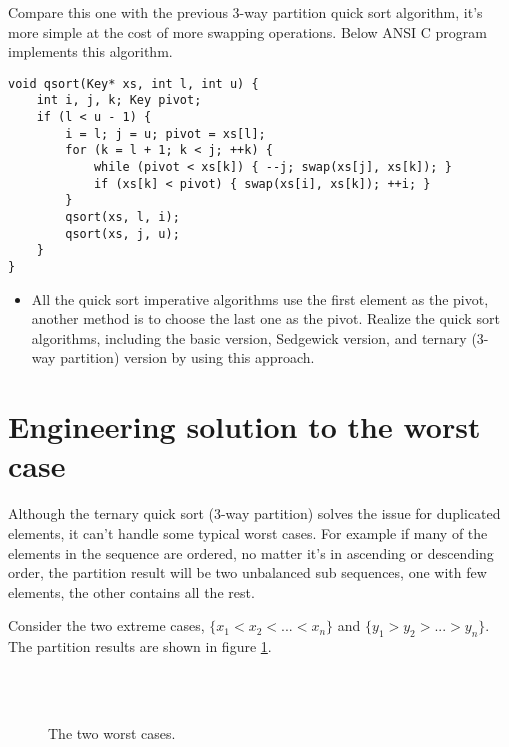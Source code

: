 \documentclass[UTF8]{article}
\begin{document}
Compare this one with the previous 3-way partition quick sort algorithm, it's more
simple at the cost of more swapping operations. Below ANSI C program implements this
algorithm.

\lstset{language=C}
\begin{lstlisting}
void qsort(Key* xs, int l, int u) {
    int i, j, k; Key pivot;
    if (l < u - 1) {
        i = l; j = u; pivot = xs[l];
        for (k = l + 1; k < j; ++k) {
            while (pivot < xs[k]) { --j; swap(xs[j], xs[k]); }
            if (xs[k] < pivot) { swap(xs[i], xs[k]); ++i; }
        }
        qsort(xs, l, i);
        qsort(xs, j, u);
    }
}
\end{lstlisting}

\begin{Exercise}
\begin{itemize}
\item All the quick sort imperative algorithms use the first element as the pivot, another method is to choose the
last one as the pivot. Realize the quick sort algorithms, including the basic version, Sedgewick version, and
ternary (3-way partition) version by using this approach.
\end{itemize}
\end{Exercise}

\section{Engineering solution to the worst case}
Although the ternary quick sort (3-way partition) solves the issue for duplicated elements, it can't handle
some typical worst cases. For example if many of the elements in the sequence are ordered, no matter it's
in ascending or descending order, the partition result will be two unbalanced sub sequences, one with few elements,
the other contains all the rest.

Consider the two extreme cases, $\{ x_1 < x_2 < ... < x_n\}$ and $\{ y_1 > y_2 > ... > y_n\}$. The partition
results are shown in figure \ref{fig:worst-cases-1}.

\begin{figure}[htbp]
   \centering
    \\
    \\
   \caption{The two worst cases.}
   \label{fig:worst-cases-1}
\end{figure}
\end{document}
